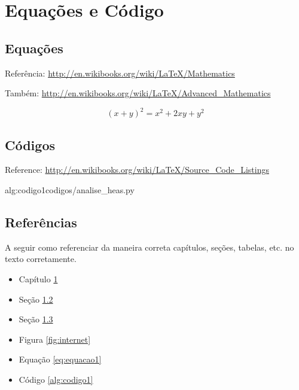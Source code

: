 \chapter{Equações e Código}
\label{chp:capitulo4}

\section{Equações}
\label{sec:equacoes}
Referência: \url{http://en.wikibooks.org/wiki/LaTeX/Mathematics}

Também: \url{http://en.wikibooks.org/wiki/LaTeX/Advanced_Mathematics}

\begin{equation}
  (x + y)^2 = x^2 + 2xy + y^2
  \label{eq:equacao1}
\end{equation}

\section{Códigos}
\label{sec:codigos}
Reference: \url{http://en.wikibooks.org/wiki/LaTeX/Source_Code_Listings}



 {alg:codigo1}{codigos/analise_heas.py}




\section{Referências}
\label{sec:referencias}

A seguir como referenciar da maneira correta capítulos, seções, tabelas, etc. no texto corretamente.\\

\begin{itemize}
  \item Capítulo \ref{chp:capitulo4}
  \item Seção \ref{sec:codigos}
  \item Seção \ref{sec:referencias}
  \item Figura \ref{fig:internet}
  \item Equação \ref{eq:equacao1}
  \item Código \ref{alg:codigo1}
\end{itemize}

